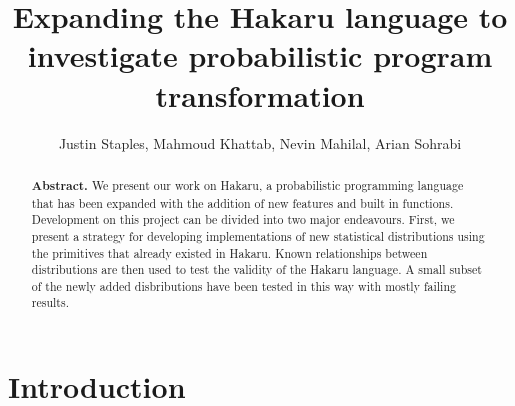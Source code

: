 \documentclass[11pt]{article}
\title{\textbf{Expanding the Hakaru language to investigate probabilistic program transformation}}
\author{Justin Staples, Mahmoud Khattab, Nevin Mahilal, Arian Sohrabi}
\begin{document}
\maketitle


\begin{abstract}
\noindent
\begin{justify}
\textbf{Abstract.} We present our work on Hakaru, a probabilistic programming language that has been expanded with the addition of new features and built in functions. Development on this project can be divided into two major endeavours. First, we present a strategy for developing implementations of new statistical distributions using the primitives that already existed in Hakaru. Known relationships between distributions are then used to test the validity of the Hakaru language. A small subset of the newly added disbributions have been tested in this way with mostly failing results. 
\end{justify}
\end{abstract}


\section{Introduction}
\end{document}
